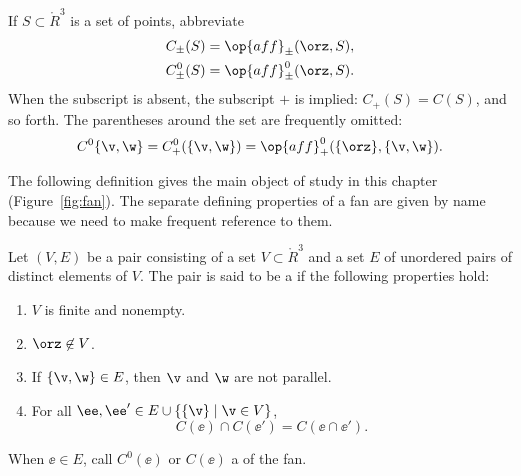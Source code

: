 

If $S\subset\ring{R}^3$ is a set of points,
abbreviate
\begin{align*}
C_\pm(S) &= \op{aff}_\pm(\orz,S),\\
C^0_\pm(S) &= \op{aff}^0_\pm(\orz,S).\\
\end{align*}
When the subscript is absent, the subscript $+$ is implied: $C_+(S)
= C(S)$, and so forth.  The parentheses around the set are frequently
omitted:
\[ C^0\{\v,\w\}=C^0_+(\{\v,\w\}) =
\op{aff}^0_+(\{\orz\},\{\v,\w\}).\] 

The following definition gives the main object of study in this
chapter (Figure~\ref{fig:fan}).  The separate defining properties of a
fan are given by name because we need to make frequent reference to
them.

\begin{definition}
Let $(V,E)$ be a pair consisting of a set $V\subset \ring{R}^3$ and
a set $E$ of unordered pairs of distinct elements of $V$.  The pair
is said to be a  if the following properties hold:
\begin{enumerate}
\item {} $V$ is finite and  nonempty.
\item {} $\orz\not\in V$.
\item {} If $\{\v,\w\} \in E$, then $\v$ and $\w$
are not parallel.
\item {}
For all $\ee ,\ee '\in E \cup \{\{\v\}\mid \v\in V\}$, 
\[ C(\ee )\cap C(\ee ') = C(\ee \cap \ee
').\] 
\end{enumerate}
When $\ee\in E$, call $C^0(\ee)$ or $C(\ee)$ a 
of the fan.
\end{definition}
%
%

\figIIAHJXI %

